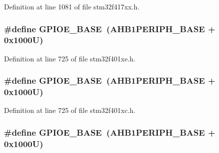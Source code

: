 Definition at line 1081 of file stm32f417xx.\+h.

\subsubsection[{\texorpdfstring{G\+P\+I\+O\+E\+\_\+\+B\+A\+SE}{GPIOE_BASE}}]{\setlength{\rightskip}{0pt plus 5cm}\#define G\+P\+I\+O\+E\+\_\+\+B\+A\+SE~({\bf A\+H\+B1\+P\+E\+R\+I\+P\+H\+\_\+\+B\+A\+SE} + 0x1000\+U)}\hypertarget{group___peripheral__registers__structures_gab487b1983d936c4fee3e9e88b95aad9d}{}\label{group___peripheral__registers__structures_gab487b1983d936c4fee3e9e88b95aad9d}


Definition at line 725 of file stm32f401xe.\+h.

\subsubsection[{\texorpdfstring{G\+P\+I\+O\+E\+\_\+\+B\+A\+SE}{GPIOE_BASE}}]{\setlength{\rightskip}{0pt plus 5cm}\#define G\+P\+I\+O\+E\+\_\+\+B\+A\+SE~({\bf A\+H\+B1\+P\+E\+R\+I\+P\+H\+\_\+\+B\+A\+SE} + 0x1000\+U)}\hypertarget{group___peripheral__registers__structures_gab487b1983d936c4fee3e9e88b95aad9d}{}\label{group___peripheral__registers__structures_gab487b1983d936c4fee3e9e88b95aad9d}


Definition at line 725 of file stm32f401xc.\+h.

\subsubsection[{\texorpdfstring{G\+P\+I\+O\+E\+\_\+\+B\+A\+SE}{GPIOE_BASE}}]{\setlength{\rightskip}{0pt plus 5cm}\#define G\+P\+I\+O\+E\+\_\+\+B\+A\+SE~({\bf A\+H\+B1\+P\+E\+R\+I\+P\+H\+\_\+\+B\+A\+SE} + 0x1000\+U)}\hypertarget{group___peripheral__registers__structures_gab487b1983d936c4fee3e9e88b95aad9d}{}\label{group___peripheral__registers__structures_gab487b1983d936c4fee3e9e88b95aad9d}


